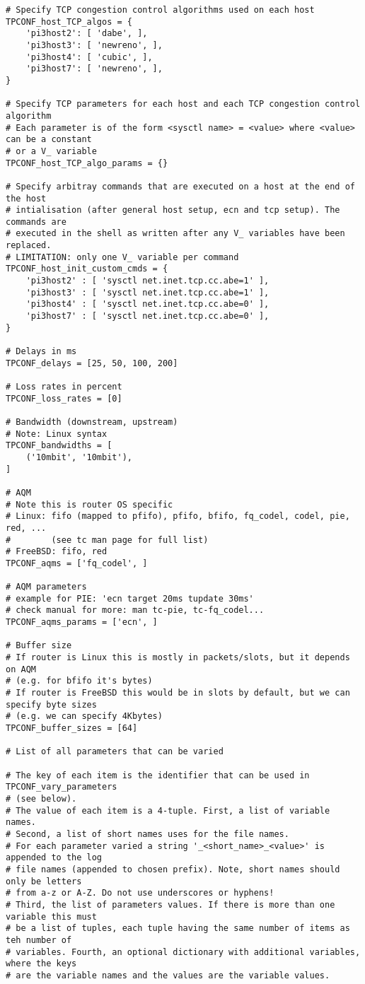 \begin{code}
\begin{verbatim}
# Specify TCP congestion control algorithms used on each host
TPCONF_host_TCP_algos = {
    'pi3host2': [ 'dabe', ],
    'pi3host3': [ 'newreno', ],
    'pi3host4': [ 'cubic', ],
    'pi3host7': [ 'newreno', ],
}

# Specify TCP parameters for each host and each TCP congestion control algorithm
# Each parameter is of the form <sysctl name> = <value> where <value> can be a constant
# or a V_ variable
TPCONF_host_TCP_algo_params = {}

# Specify arbitray commands that are executed on a host at the end of the host 
# intialisation (after general host setup, ecn and tcp setup). The commands are
# executed in the shell as written after any V_ variables have been replaced.
# LIMITATION: only one V_ variable per command
TPCONF_host_init_custom_cmds = {
    'pi3host2' : [ 'sysctl net.inet.tcp.cc.abe=1' ],
    'pi3host3' : [ 'sysctl net.inet.tcp.cc.abe=1' ],
    'pi3host4' : [ 'sysctl net.inet.tcp.cc.abe=0' ],
    'pi3host7' : [ 'sysctl net.inet.tcp.cc.abe=0' ],
}

# Delays in ms
TPCONF_delays = [25, 50, 100, 200]

# Loss rates in percent
TPCONF_loss_rates = [0]

# Bandwidth (downstream, upstream)
# Note: Linux syntax
TPCONF_bandwidths = [
    ('10mbit', '10mbit'),
]

# AQM
# Note this is router OS specific
# Linux: fifo (mapped to pfifo), pfifo, bfifo, fq_codel, codel, pie, red, ...
#        (see tc man page for full list)
# FreeBSD: fifo, red
TPCONF_aqms = ['fq_codel', ]

# AQM parameters
# example for PIE: 'ecn target 20ms tupdate 30ms'
# check manual for more: man tc-pie, tc-fq_codel...
TPCONF_aqms_params = ['ecn', ]

# Buffer size
# If router is Linux this is mostly in packets/slots, but it depends on AQM
# (e.g. for bfifo it's bytes)
# If router is FreeBSD this would be in slots by default, but we can specify byte sizes
# (e.g. we can specify 4Kbytes)
TPCONF_buffer_sizes = [64]

# List of all parameters that can be varied

# The key of each item is the identifier that can be used in TPCONF_vary_parameters
# (see below).
# The value of each item is a 4-tuple. First, a list of variable names.
# Second, a list of short names uses for the file names.
# For each parameter varied a string '_<short_name>_<value>' is appended to the log
# file names (appended to chosen prefix). Note, short names should only be letters
# from a-z or A-Z. Do not use underscores or hyphens!
# Third, the list of parameters values. If there is more than one variable this must
# be a list of tuples, each tuple having the same number of items as teh number of
# variables. Fourth, an optional dictionary with additional variables, where the keys
# are the variable names and the values are the variable values.


\end{verbatim}
\end{code}
